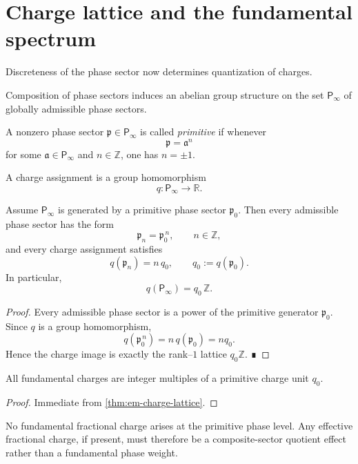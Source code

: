 \section{Charge lattice and the fundamental spectrum}
\label{sec:em-charge-lattice}
Discreteness of the phase sector now determines quantization of charges.
\begin{definition}
	Composition of phase sectors induces an abelian group structure on the
	set \(\mathsf P_\infty\) of globally admissible phase sectors.
\end{definition}
\begin{definition}
	A nonzero phase sector \(\mathfrak p\in \mathsf P_\infty\) is called
	\emph{primitive} if whenever
	\[
		\mathfrak p=\mathfrak a^n
	\]
	for some \(\mathfrak a\in \mathsf P_\infty\) and \(n\in\mathbb Z\), one
	has \(n=\pm1\).
\end{definition}
\begin{definition}
	A charge assignment is a group homomorphism
	\[
		q:\mathsf P_\infty\to \mathbb R.
	\]
\end{definition}
\begin{theorem}
	\label{thm:em-charge-lattice}
	Assume \(\mathsf P_\infty\) is generated by a primitive phase sector
	\(\mathfrak p_0\).
	Then every admissible phase sector has the form
	\[
		\mathfrak p_n=\mathfrak p_0^{\,n},
		\qquad n\in\mathbb Z,
	\]
	and every charge assignment satisfies
	\[
		q(\mathfrak p_n)=n\,q_0,
		\qquad q_0:=q(\mathfrak p_0).
	\]
	In particular,
	\[
		q(\mathsf P_\infty)=q_0\,\mathbb Z.
	\]
\end{theorem}
\begin{proof}
	Every admissible phase sector is a power of the primitive generator
	\(\mathfrak p_0\).
	Since \(q\) is a group homomorphism,
	\[
		q(\mathfrak p_0^{\,n})=n\,q(\mathfrak p_0)=nq_0.
	\]
	Hence the charge image is exactly the rank--\(1\) lattice
	\(q_0\mathbb Z\). ∎
\end{proof}
\begin{corollary}
	All fundamental charges are integer multiples of a primitive charge unit
	\(q_0\).
\end{corollary}
\begin{proof}
	Immediate from \cref{thm:em-charge-lattice}.
\end{proof}
\begin{remark}
	No fundamental fractional charge arises at the primitive phase level.
	Any effective fractional charge, if present, must therefore be a
	composite-sector quotient effect rather than a fundamental phase
	weight.
\end{remark}
